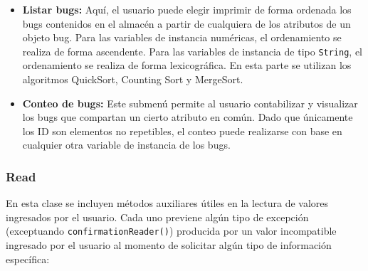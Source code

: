 \documentclass[12pt,letterpaper]{article}
\begin{document}
\begin{itemize}
    \item \textbf{Listar bugs:} Aquí, el usuario puede elegir imprimir de forma ordenada los bugs contenidos en el almacén a partir de cualquiera de los atributos de un objeto bug. Para las variables de instancia numéricas, el ordenamiento se realiza de forma ascendente. Para las variables de instancia de tipo \texttt{String}, el ordenamiento se realiza de forma lexicográfica. En esta parte se utilizan los algoritmos QuickSort, Counting Sort y MergeSort.
    \item \textbf{Conteo de bugs:} Este submenú permite al usuario contabilizar y visualizar los bugs que compartan un cierto atributo en común. Dado que únicamente los ID son elementos no repetibles, el conteo puede realizarse con base en cualquier otra variable de instancia de los bugs.
\end{itemize}

\subsubsection*{Read}
En esta clase se incluyen métodos auxiliares útiles en la lectura de valores ingresados por el usuario. Cada uno previene algún tipo de excepción (exceptuando \texttt{confirmationReader()}) producida por un valor incompatible ingresado por el usuario al momento de solicitar algún tipo de información específica:
\end{document}
